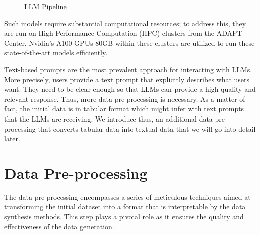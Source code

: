 \begin{figure}[H]
    \centering
    \caption{LLM Pipeline}
    \label{fig:llama3_pipeline}
\end{figure}

Such models require substantial computational resources; to address this, they are run on High-Performance Computation (HPC) clusters from the ADAPT Center. Nvidia's A100 GPUs 80GB within these clusters are utilized to run these state-of-the-art models efficiently.

Text-based prompts are the most prevalent approach for interacting with LLMs. More precisely, users provide a text prompt that explicitly describes what users want. They need to be clear enough so that LLMs can provide a high-quality and relevant response. Thus, more data pre-processing is necessary. As a matter of fact, the initial data is in tabular format which might infer with text prompts that the LLMs are receiving. We introduce thus, an additional data pre-processing that converts tabular data into textual data that we will go into detail later. 



\section{Data Pre-processing}

The data pre-processing encompasses a series of meticulous techniques aimed at transforming the initial dataset into a format that is interpretable by the data synthesis methods. This step plays a pivotal role as it ensures the quality and effectiveness of the data generation.

